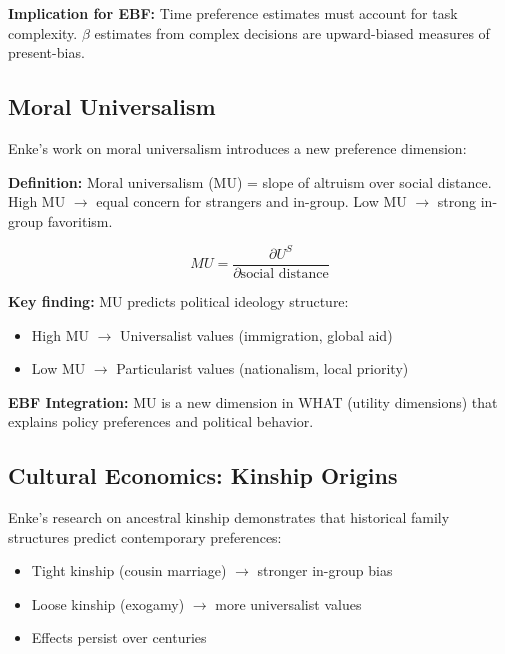 \textbf{Implication for EBF:} Time preference estimates must account for
task complexity. $\beta$ estimates from complex decisions are upward-biased
measures of present-bias.

\subsection{Moral Universalism}
\label{sec:enk-mu}

Enke's work on moral universalism \citep{enke2019moral, enke2022universalism,
enke2025universalism} introduces a new preference dimension:

\textbf{Definition:} Moral universalism (MU) = slope of altruism over social
distance. High MU $\rightarrow$ equal concern for strangers and in-group.
Low MU $\rightarrow$ strong in-group favoritism.

\begin{equation}
MU = \frac{\partial U^S}{\partial \text{social distance}}
\end{equation}

\textbf{Key finding:} MU predicts political ideology structure:
\begin{itemize}[nosep]
    \item High MU $\rightarrow$ Universalist values (immigration, global aid)
    \item Low MU $\rightarrow$ Particularist values (nationalism, local priority)
\end{itemize}

\textbf{EBF Integration:} MU is a new dimension in WHAT (utility dimensions)
that explains policy preferences and political behavior.

\subsection{Cultural Economics: Kinship Origins}
\label{sec:enk-kinship}

Enke's research on ancestral kinship \citep{enke2017ancestral, enke2022preferences}
demonstrates that historical family structures predict contemporary preferences:

\begin{itemize}[nosep]
    \item Tight kinship (cousin marriage) $\rightarrow$ stronger in-group bias
    \item Loose kinship (exogamy) $\rightarrow$ more universalist values
    \item Effects persist over centuries
\end{itemize}

